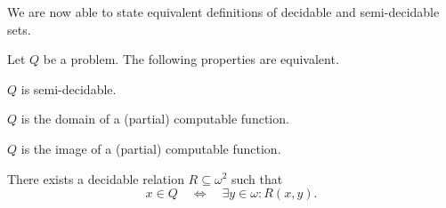 We are now able to state equivalent definitions of decidable and semi-decidable
sets.

\begin{pro}\label{pro:characterizations of ce sets}
  Let \(Q\) be a problem. The following properties are equivalent.
  \begin{thmlist}
    \item \(Q\) is semi-decidable.
    \item \(Q\) is the domain of a (partial) computable function.
    \item \(Q\) is the image of a (partial) computable function.
    \item There exists a decidable relation \(R \subseteq ω^2\) such that
    \[
      x ∈ Q \quad ⇔ \quad ∃ y ∈ ω : R(x, y).
    \]
  \end{thmlist}
\end{pro}
